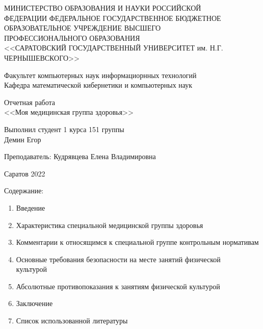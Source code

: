 \thispagestyle{empty}
    \begin{center}
        МИНИСТЕРСТВО ОБРАЗОВАНИЯ И НАУКИ РОССИЙСКОЙ \\
        ФЕДЕРАЦИИ ФЕДЕРАЛЬНОЕ ГОСУДАРСТВЕННОЕ БЮДЖЕТНОЕ \\ 
        ОБРАЗОВАТЕЛЬНОЕ УЧРЕЖДЕНИЕ ВЫСШЕГО \\
        ПРОФЕССИОНАЛЬНОГО ОБРАЗОВАНИЯ \\
        <<САРАТОВСКИЙ ГОСУДАРСТВЕННЫЙ УНИВЕРСИТЕТ им. Н.Г.\\
        ЧЕРНЫШЕВСКОГО>>
      \vspace*{42pt}

       Факультет компьютерных наук информациорнных технологий \\
       Кафедра математической кибернетики и компьютерных наук
      \vspace*{112pt}

       Отчетная работа\\
       <<Моя медицинская группа здоровья>>
      \vspace*{112pt}      
  \end{center}

  \begin{flushright}
    Выполнил студент 1 курса 151 группы \\
    Демин Егор
    \vspace*{14pt}

    Преподаватель: Кудрявцева Елена Владимировна\\
  \end{flushright}
  \vspace*{168pt}

  \centering
  Саратов 2022

  \newpage
  \thispagestyle{empty}
  
  \begin{flushleft}
  Содержание:
  \begin{enumerate} 
    \item Введение
    \item Характеристика специальной медицинской группы здоровья
    \item Комментарии к относящимся к специальной группе контрольным нормативам
    \item Основные требования безопасности на месте занятий физической\\ культурой 
    \item Абсолютные противопоказания к занятиям физической культурой
    \item Заключение
    \item Список использованной литературы
  \end{enumerate}
  \newpage
  \end{flushleft}
  